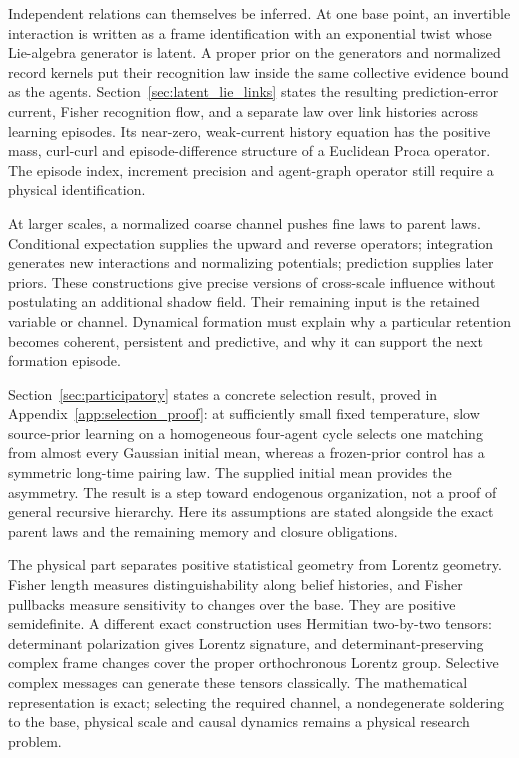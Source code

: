 Independent relations can themselves be inferred. At one base point, an invertible interaction is written as a frame identification with an exponential twist whose Lie-algebra generator is latent. A proper prior on the generators and normalized record kernels put their recognition law inside the same collective evidence bound as the agents. Section~\ref{sec:latent_lie_links} states the resulting prediction-error current, Fisher recognition flow, and a separate law over link histories across learning episodes. Its near-zero, weak-current history equation has the positive mass, curl-curl and episode-difference structure of a Euclidean Proca operator. The episode index, increment precision and agent-graph operator still require a physical identification.

At larger scales, a normalized coarse channel pushes fine laws to parent laws. Conditional expectation supplies the upward and reverse operators; integration generates new interactions and normalizing potentials; prediction supplies later priors. These constructions give precise versions of cross-scale influence without postulating an additional shadow field. Their remaining input is the retained variable or channel. Dynamical formation must explain why a particular retention becomes coherent, persistent and predictive, and why it can support the next formation episode.

Section~\ref{sec:participatory} states a concrete selection result, proved in Appendix~\ref{app:selection_proof}: at sufficiently small fixed temperature, slow source-prior learning on a homogeneous four-agent cycle selects one matching from almost every Gaussian initial mean, whereas a frozen-prior control has a symmetric long-time pairing law. The supplied initial mean provides the asymmetry. The result is a step toward endogenous organization, not a proof of general recursive hierarchy. Here its assumptions are stated alongside the exact parent laws and the remaining memory and closure obligations.

The physical part separates positive statistical geometry from Lorentz geometry. Fisher length measures distinguishability along belief histories, and Fisher pullbacks measure sensitivity to changes over the base. They are positive semidefinite. A different exact construction uses Hermitian two-by-two tensors: determinant polarization gives Lorentz signature, and determinant-preserving complex frame changes cover the proper orthochronous Lorentz group. Selective complex messages can generate these tensors classically. The mathematical representation is exact; selecting the required channel, a nondegenerate soldering to the base, physical scale and causal dynamics remains a physical research problem.

